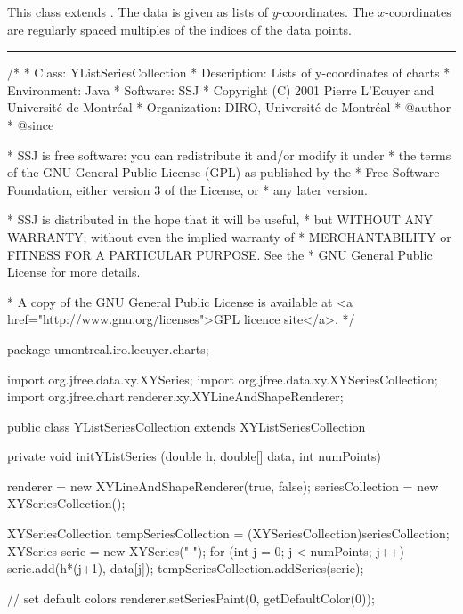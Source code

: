 
This class extends
.
The data is given as lists of $y$-coordinates. The $x$-coordinates are
regularly spaced multiples of the indices of the data points.

\bigskip\hrule
\begin{code}
\begin{hide}
/*
 * Class:        YListSeriesCollection
 * Description:  Lists of y-coordinates of charts
 * Environment:  Java
 * Software:     SSJ 
 * Copyright (C) 2001  Pierre L'Ecuyer and Université de Montréal
 * Organization: DIRO, Université de Montréal
 * @author       
 * @since

 * SSJ is free software: you can redistribute it and/or modify it under
 * the terms of the GNU General Public License (GPL) as published by the
 * Free Software Foundation, either version 3 of the License, or
 * any later version.

 * SSJ is distributed in the hope that it will be useful,
 * but WITHOUT ANY WARRANTY; without even the implied warranty of
 * MERCHANTABILITY or FITNESS FOR A PARTICULAR PURPOSE.  See the
 * GNU General Public License for more details.

 * A copy of the GNU General Public License is available at
   <a href="http://www.gnu.org/licenses">GPL licence site</a>.
 */
\end{hide}
package umontreal.iro.lecuyer.charts;\begin{hide}

import   org.jfree.data.xy.XYSeries;
import   org.jfree.data.xy.XYSeriesCollection;
import   org.jfree.chart.renderer.xy.XYLineAndShapeRenderer;
\end{hide}

public class YListSeriesCollection extends XYListSeriesCollection \begin{hide} {

   private void initYListSeries (double h, double[] data, int numPoints)
   {
      renderer = new XYLineAndShapeRenderer(true, false);
      seriesCollection = new XYSeriesCollection();

      XYSeriesCollection tempSeriesCollection =
         (XYSeriesCollection)seriesCollection;
      XYSeries serie = new XYSeries(" ");
      for (int j = 0; j < numPoints; j++)
         serie.add(h*(j+1), data[j]);
      tempSeriesCollection.addSeries(serie);

      // set default colors
      renderer.setSeriesPaint(0, getDefaultColor(0));

}}
\end{hide}
\end{code}
